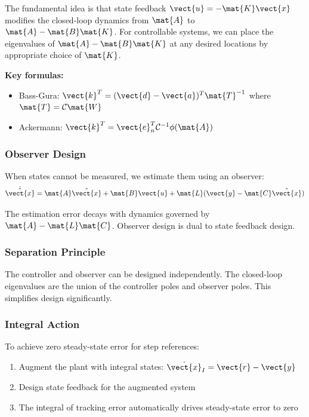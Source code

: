 The fundamental idea is that state feedback $\vect{u} = -\mat{K}\vect{x}$ modifies the closed-loop dynamics from $\mat{A}$ to $\mat{A} - \mat{B}\mat{K}$. For controllable systems, we can place the eigenvalues of $\mat{A} - \mat{B}\mat{K}$ at any desired locations by appropriate choice of $\mat{K}$.

\textbf{Key formulas:}
\begin{itemize}
    \item Bass-Gura: $\vect{k}^T = (\vect{d} - \vect{a})^T\mat{T}^{-1}$ where $\mat{T} = \mathcal{C}\mat{W}$
    \item Ackermann: $\vect{k}^T = \vect{e}_n^T\mathcal{C}^{-1}\phi(\mat{A})$
\end{itemize}

\subsubsection{Observer Design}

When states cannot be measured, we estimate them using an observer:
\begin{equation}
\dot{\hat{\vect{x}}} = \mat{A}\hat{\vect{x}} + \mat{B}\vect{u} + \mat{L}(\vect{y} - \mat{C}\hat{\vect{x}})
\end{equation}

The estimation error decays with dynamics governed by $\mat{A} - \mat{L}\mat{C}$. Observer design is dual to state feedback design.

\subsubsection{Separation Principle}

The controller and observer can be designed independently. The closed-loop eigenvalues are the union of the controller poles and observer poles. This simplifies design significantly.

\subsubsection{Integral Action}

To achieve zero steady-state error for step references:
\begin{enumerate}
    \item Augment the plant with integral states: $\dot{\vect{x}}_I = \vect{r} - \vect{y}$
    \item Design state feedback for the augmented system
    \item The integral of tracking error automatically drives steady-state error to zero
\end{enumerate}

